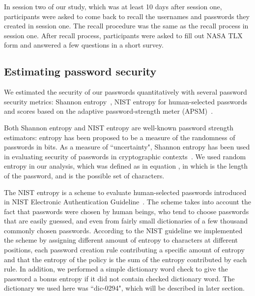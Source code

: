 \documentclass[conference]{IEEEtran}
\begin{document}
In session two of our study, which was at least 10 days after session one, participants were asked to come back to recall the usernames and passwords they created in session one. The recall procedure was the same as the recall process in session one. After recall process, participants were asked to fill out NASA TLX form and answered a few questions in a short survey.
 
\subsection{Estimating password security}

We estimated the security of our passwords quantitatively with several password security metrics: Shannon entropy~\cite{Shannon:2001:MTC:584091.584093, 394764}, NIST entropy for human-selected passwords~\cite{Burr:2011:SEA:2206278} and scores based on the adaptive password-strength meter (APSM)~\cite{Castelluccia:2012:NDSS:markov}. 


Both Shannon entropy and NIST entropy are well-known password strength estimators: entropy has been proposed to be a measure of the randomness of passwords in bits. As a measure of ``uncertainty", Shannon entropy has been used in evaluating security of passwords in cryptographic contexts~\cite{Burr:2011:SEA:2206278}. We used random entropy in our analysis, which was defined as in equation , in which  is the length of the password, and  is the possible set of characters.

The NIST entropy is a scheme to evaluate human-selected passwords introduced in NIST Electronic Authentication Guideline~\cite{Burr:2011:SEA:2206278}. The scheme takes into account the fact that passwords were chosen by human beings, who tend to choose passwords that are easily guessed, and even from fairly small dictionaries of a few thousand commonly chosen passwords. According to the NIST guideline we implemented the scheme by assigning different amount of entropy to characters at different positions, each password creation rule contributing a specific amount of entropy and that the entropy of the policy is the sum of the entropy contributed by each rule. In addition, we performed a simple dictionary word check to give the password a bonus entropy if it did not contain checked dictionary word. The dictionary we used here was ``dic-0294", which will be described in later section.
\end{document}
